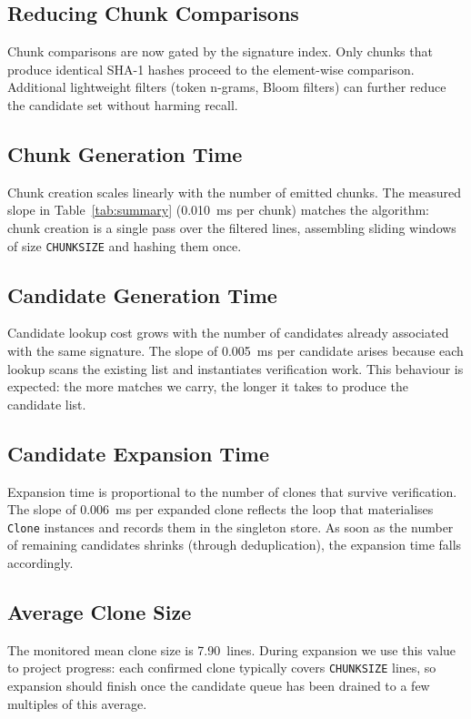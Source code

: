 \documentclass[11pt,a4paper]{article}
\begin{document}
\subsection{Reducing Chunk Comparisons}
Chunk comparisons are now gated by the signature index. Only chunks that produce identical SHA-1
hashes proceed to the element-wise comparison. Additional lightweight filters (token n-grams, Bloom
filters) can further reduce the candidate set without harming recall.

\subsection{Chunk Generation Time}
Chunk creation scales linearly with the number of emitted chunks. The measured slope in
Table~\ref{tab:summary} (\SI{0.010}{\milli\second} per chunk) matches the algorithm: chunk creation
is a single pass over the filtered lines, assembling sliding windows of size \texttt{CHUNKSIZE} and
hashing them once.

\subsection{Candidate Generation Time}
Candidate lookup cost grows with the number of candidates already associated with the same signature.
The slope of \SI{0.005}{\milli\second} per candidate arises because each lookup scans the existing
list and instantiates verification work. This behaviour is expected: the more matches we carry, the
longer it takes to produce the candidate list.

\subsection{Candidate Expansion Time}
Expansion time is proportional to the number of clones that survive verification. The slope of
\SI{0.006}{\milli\second} per expanded clone reflects the loop that materialises \texttt{Clone}
instances and records them in the singleton store. As soon as the number of remaining candidates
shrinks (through deduplication), the expansion time falls accordingly.

\subsection{Average Clone Size}
The monitored mean clone size is \SI{7.90}{lines}. During expansion we use this value to project
progress: each confirmed clone typically covers \texttt{CHUNKSIZE} lines, so expansion should finish
once the candidate queue has been drained to a few multiples of this average.
\end{document}
